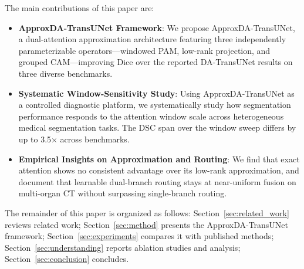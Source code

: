 The main contributions of this paper are:

\begin{itemize}

\item \textbf{ApproxDA-TransUNet Framework}: We propose ApproxDA-TransUNet, a dual-attention approximation architecture featuring three independently parameterizable operators---windowed PAM, low-rank projection, and grouped CAM---improving Dice over the reported DA-TransUNet results on three diverse benchmarks.

\item \textbf{Systematic Window-Sensitivity Study}: Using ApproxDA-TransUNet as a controlled diagnostic platform, we systematically study how segmentation performance responds to the attention window scale across heterogeneous medical segmentation tasks. The DSC span over the window sweep differs by up to 3.5$\times$ across benchmarks.

\item \textbf{Empirical Insights on Approximation and Routing}: We find that exact attention shows no consistent advantage over its low-rank approximation, and document that learnable dual-branch routing stays at near-uniform fusion on multi-organ CT without surpassing single-branch routing.

\end{itemize}

The remainder of this paper is organized as follows: Section~\ref{sec:related_work} reviews related work; Section~\ref{sec:method} presents the ApproxDA-TransUNet framework; Section~\ref{sec:experiments} compares it with published methods; Section~\ref{sec:understanding} reports ablation studies and analysis; Section~\ref{sec:conclusion} concludes.
